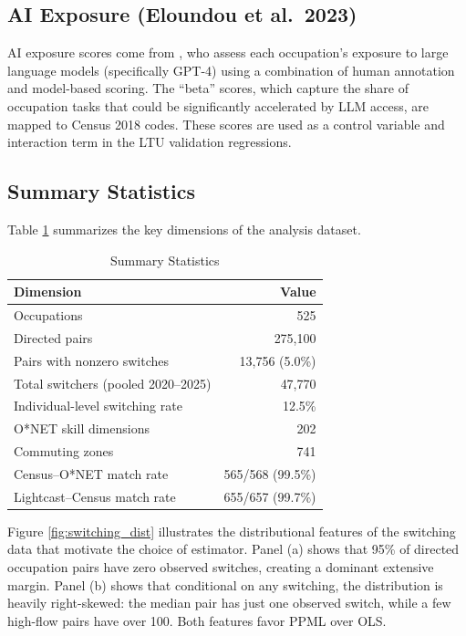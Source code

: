 \documentclass[12pt]{article}
\begin{document}
\subsection{AI Exposure (Eloundou et al.\ 2023)}
\label{sec:data_ai}

AI exposure scores come from \citet{eloundou2023}, who assess each occupation's exposure to large language models (specifically GPT-4) using a combination of human annotation and model-based scoring. The ``beta'' scores, which capture the share of occupation tasks that could be significantly accelerated by LLM access, are mapped to Census 2018 codes. These scores are used as a control variable and interaction term in the LTU validation regressions.

\subsection{Summary Statistics}
\label{sec:data_summary}

Table \ref{tab:summary} summarizes the key dimensions of the analysis dataset.

\begin{table}[H]
\centering
\caption{Summary Statistics}
\label{tab:summary}
\begin{tabular}{lr}
\toprule
\textbf{Dimension} & \textbf{Value} \\
\midrule
Occupations & 525 \\
Directed pairs & 275,100 \\
Pairs with nonzero switches & 13,756 (5.0\%) \\
Total switchers (pooled 2020--2025) & 47,770 \\
Individual-level switching rate & 12.5\% \\
O*NET skill dimensions & 202 \\
Commuting zones & 741 \\
Census--O*NET match rate & 565/568 (99.5\%) \\
Lightcast--Census match rate & 655/657 (99.7\%) \\
\bottomrule
\end{tabular}
\end{table}

Figure \ref{fig:switching_dist} illustrates the distributional features of the switching data that motivate the choice of estimator. Panel (a) shows that 95\% of directed occupation pairs have zero observed switches, creating a dominant extensive margin. Panel (b) shows that conditional on any switching, the distribution is heavily right-skewed: the median pair has just one observed switch, while a few high-flow pairs have over 100. Both features favor PPML over OLS.
\end{document}
